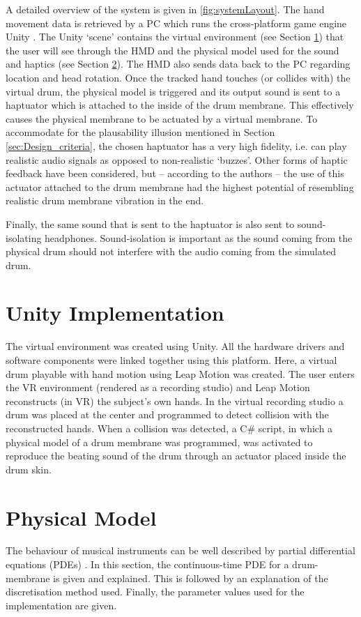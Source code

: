     A detailed overview of the system is given in \autoref{fig:systemLayout}. The hand movement data is retrieved by a PC which runs the cross-platform game engine Unity \cite{unity}. The Unity `scene' contains the virtual environment (see Section \ref{sec:unity}) that the user will see through the HMD and the physical model used for the sound and haptics (see Section \ref{sec:PM}). The HMD also sends data back to the PC regarding location and head rotation. Once the tracked hand touches (or collides with) the virtual drum, the physical model is triggered and its output sound is sent to a haptuator which is attached to the inside of the drum membrane. This effectively causes the physical membrane to be actuated by a virtual membrane. To accommodate for the plausability illusion mentioned in Section \ref{sec:Design_criteria}, the chosen haptuator has a very high fidelity, i.e. can play realistic audio signals as opposed to non-realistic `buzzes'. Other forms of haptic feedback have been considered, but -- according to the authors -- the use of this actuator attached to the drum membrane had the highest potential of resembling realistic drum membrane vibration in the end.
    
    Finally, the same sound that is sent to the haptuator is also sent to sound-isolating headphones. Sound-isolation is important as the sound coming from the physical drum should not interfere with the audio coming from the simulated drum.
    
    \section{Unity Implementation}\label{sec:unity}
    The virtual environment was  created using Unity. All the hardware drivers and software components were linked together using this platform. Here, a virtual drum playable with hand motion using Leap Motion was created. The user enters the VR environment (rendered as a recording studio) and Leap Motion reconstructs (in VR) the subject's own hands. In the virtual recording studio a drum was placed at the center and programmed to detect collision with the reconstructed hands. When a collision was detected, a C\# script, in which a physical model of a drum membrane was programmed, was activated to reproduce the beating sound of the drum through an actuator placed inside the drum skin.
    
    \section{Physical Model}\label{sec:PM}
    The behaviour of musical instruments can be well described by partial differential equations (PDEs) \cite{Fletcher1998}. In this section, the continuous-time PDE for a drum-membrane is given and explained. This is followed by an explanation of the discretisation method used. Finally, the parameter values used for the implementation are given. 
    
